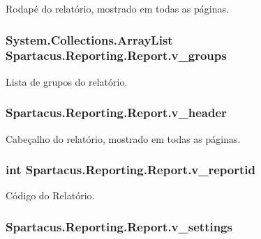 Rodapé do relatório, mostrado em todas as páginas. 

\hypertarget{classSpartacus_1_1Reporting_1_1Report_ac349db22d6c8d4e23b60f3f7bb249057}{
\subsubsection[{v\+\_\+groups}]{\setlength{\rightskip}{0pt plus 5cm}System.\+Collections.\+Array\+List Spartacus.\+Reporting.\+Report.\+v\+\_\+groups}}\label{classSpartacus_1_1Reporting_1_1Report_ac349db22d6c8d4e23b60f3f7bb249057}


Lista de grupos do relatório. 

\hypertarget{classSpartacus_1_1Reporting_1_1Report_a714fe9a95697a7bb0aef46cd2be55719}{
\subsubsection[{v\+\_\+header}]{ Spartacus.\+Reporting.\+Report.\+v\+\_\+header}}\label{classSpartacus_1_1Reporting_1_1Report_a714fe9a95697a7bb0aef46cd2be55719}


Cabeçalho do relatório, mostrado em todas as páginas. 

\hypertarget{classSpartacus_1_1Reporting_1_1Report_a852ec5a1b9aaa894595e594cd33d5e09}{
\subsubsection[{v\+\_\+reportid}]{\setlength{\rightskip}{0pt plus 5cm}int Spartacus.\+Reporting.\+Report.\+v\+\_\+reportid}}\label{classSpartacus_1_1Reporting_1_1Report_a852ec5a1b9aaa894595e594cd33d5e09}


Código do Relatório. 

\hypertarget{classSpartacus_1_1Reporting_1_1Report_a13e0785868400d716ccce1d34cd786f1}{
\subsubsection[{v\+\_\+settings}]{ Spartacus.\+Reporting.\+Report.\+v\+\_\+settings}}\label{classSpartacus_1_1Reporting_1_1Report_a13e0785868400d716ccce1d34cd786f1}


